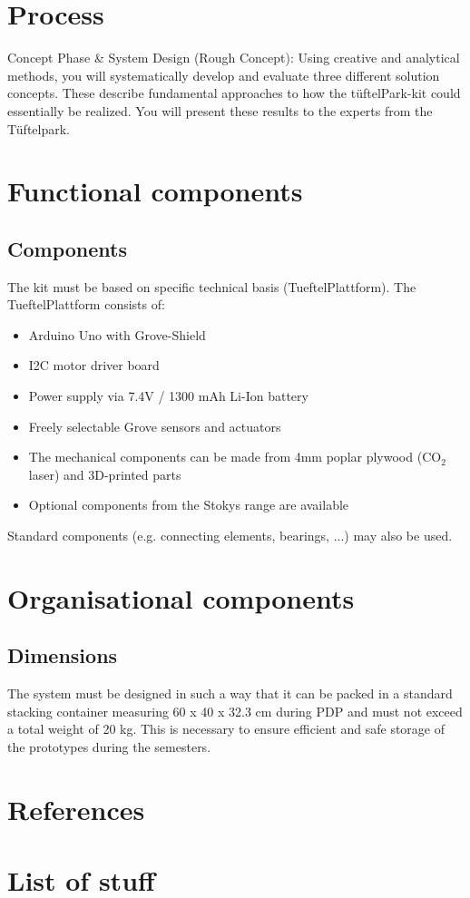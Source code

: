 \documentclass{article}
\begin{document}
\section{Process}
Concept Phase \& System Design (Rough Concept): Using creative and analytical methods, you will
systematically develop and evaluate three different solution concepts. These describe fundamental
approaches to how the tüftelPark-kit could essentially be realized. You will present these results to
the experts from the Tüftelpark.

\section{Functional components}
\subsection{Components}
The kit must be based on specific technical basis (TueftelPlattform).
The TueftelPlattform consists of:
\begin{itemize}
    \item Arduino Uno with Grove-Shield
    \item I2C motor driver board
    \item Power supply via 7.4V / 1300 mAh Li-Ion battery
    \item Freely selectable Grove sensors and actuators
    \item The mechanical components can be made from 4mm poplar plywood (CO$_2$ laser) and 3D-printed parts
    \item Optional components from the Stokys range are available
\end{itemize}

Standard components (e.g. connecting elements, bearings, ...) may also be used.

\section{Organisational components}
\subsection{Dimensions}
The system must be designed in such a way that it can be packed in a standard stacking
container measuring 60 x 40 x 32.3 cm during PDP and must not exceed a total weight of 20 kg. This
is necessary to ensure efficient and safe storage of the prototypes during the semesters.








\newpage
\section{References}

\appendix
\section{List of stuff}
\end{document}
